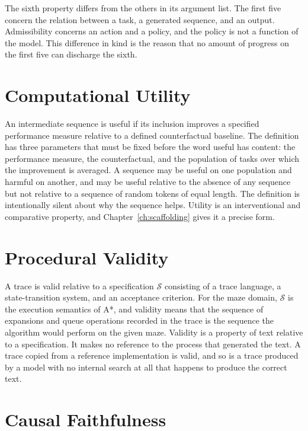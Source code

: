 The sixth property differs from the others in its argument list. The first five concern the relation between a task, a generated sequence, and an output. Admissibility concerns an action and a policy, and the policy is not a function of the model. This difference in kind is the reason that no amount of progress on the first five can discharge the sixth.

\section{Computational Utility}

An intermediate sequence is useful if its inclusion improves a specified performance measure relative to a defined counterfactual baseline. The definition has three parameters that must be fixed before the word useful has content: the performance measure, the counterfactual, and the population of tasks over which the improvement is averaged. A sequence may be useful on one population and harmful on another, and may be useful relative to the absence of any sequence but not relative to a sequence of random tokens of equal length. The definition is intentionally silent about why the sequence helps. Utility is an interventional and comparative property, and Chapter~\ref{ch:scaffolding} gives it a precise form.

\section{Procedural Validity}

A trace is valid relative to a specification $\mathcal S$ consisting of a trace language, a state-transition system, and an acceptance criterion. For the maze domain, $\mathcal S$ is the execution semantics of A*, and validity means that the sequence of expansions and queue operations recorded in the trace is the sequence the algorithm would perform on the given maze. Validity is a property of text relative to a specification. It makes no reference to the process that generated the text. A trace copied from a reference implementation is valid, and so is a trace produced by a model with no internal search at all that happens to produce the correct text.

\section{Causal Faithfulness}

